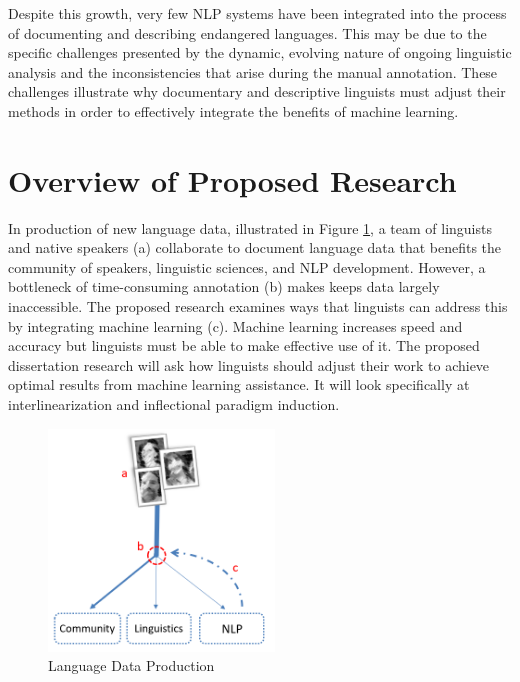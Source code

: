 Despite this growth, very few NLP systems have been integrated into the process of documenting and describing endangered languages. This may be due to the specific challenges presented by the dynamic, evolving nature of ongoing linguistic analysis and the inconsistencies that arise during the manual annotation. These challenges illustrate why documentary and descriptive linguists must adjust their methods
in order to effectively integrate the benefits of machine learning.

\section{Overview of Proposed Research}

In production of new language data, illustrated in Figure \ref{fig:flowchart}, a team of linguists and native speakers (a) collaborate to document language data that benefits the community of speakers, linguistic sciences, and NLP development. However, a bottleneck of time-consuming annotation (b) makes keeps data largely inaccessible. The proposed research examines ways that linguists can address this by integrating machine learning (c). Machine learning increases %
speed and accuracy but linguists must be able to make effective use of it. The proposed dissertation research 
will ask how linguists should adjust their work to achieve optimal results from machine learning assistance. It will look specifically at interlinearization and inflectional paradigm induction.

\begin{figure}[h!]
\centering
\includegraphics[width=6cm]{figs/Flowchart.PNG}
\caption[Language Data Production]{Language Data Production}
\label{fig:flowchart}
\end{figure}


